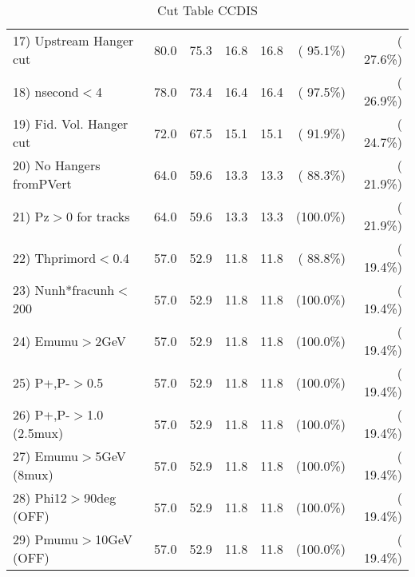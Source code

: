 \begin{table}[h!]
\begin{tabular}{||l||r|r|r|r|r|r||}
 17) Upstream Hanger cut  &         80.0 &         75.3 &         16.8 &         16.8 & ( 95.1\%) & ( 27.6\%) \\
 18) nsecond$<$4          &         78.0 &         73.4 &         16.4 &         16.4 & ( 97.5\%) & ( 26.9\%) \\
 19) Fid. Vol. Hanger cut &         72.0 &         67.5 &         15.1 &         15.1 & ( 91.9\%) & ( 24.7\%) \\
 20) No Hangers fromPVert &         64.0 &         59.6 &         13.3 &         13.3 & ( 88.3\%) & ( 21.9\%) \\
 21) Pz$>$0 for tracks    &         64.0 &         59.6 &         13.3 &         13.3 & (100.0\%) & ( 21.9\%) \\
 22) Thprimord$<$0.4      &         57.0 &         52.9 &         11.8 &         11.8 & ( 88.8\%) & ( 19.4\%) \\
 23) Nunh*fracunh$<$200   &         57.0 &         52.9 &         11.8 &         11.8 & (100.0\%) & ( 19.4\%) \\
 24) Emumu$>$2GeV         &         57.0 &         52.9 &         11.8 &         11.8 & (100.0\%) & ( 19.4\%) \\
 25) P+,P-$>$0.5          &         57.0 &         52.9 &         11.8 &         11.8 & (100.0\%) & ( 19.4\%) \\
 26) P+,P-$>$1.0 (2.5mux) &         57.0 &         52.9 &         11.8 &         11.8 & (100.0\%) & ( 19.4\%) \\
 27) Emumu$>$5GeV  (8mux) &         57.0 &         52.9 &         11.8 &         11.8 & (100.0\%) & ( 19.4\%) \\
 28) Phi12$>$90deg  (OFF) &         57.0 &         52.9 &         11.8 &         11.8 & (100.0\%) & ( 19.4\%) \\
 29) Pmumu$>$10GeV  (OFF) &         57.0 &         52.9 &         11.8 &         11.8 & (100.0\%) & ( 19.4\%) \\
 \hline
 \hline
 \end{tabular}
 \caption{Cut Table  CCDIS    }
 \label{tab-cutcohjpsi-mumu_ncdis}
 \end{table}
